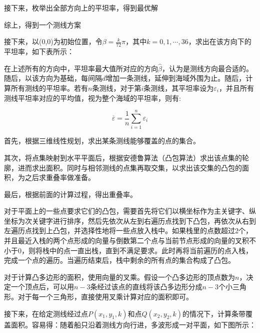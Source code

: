 接下来，枚举出全部方向上的平坦率，得到最优解

综上，得到一个测线方案

接下来，以(0,0)为初始位置，令$\beta = \frac{k}{72}\pi$，其中$k = 0, 1, \cdots, 36$，求出在该方向下的平坦率，如下表所示：




在上述所有的方向中，平坦率最大值所对应的方向$\hat \beta$，认为是测线方向最合适的。随后，以该方向为基础，每间隔$d$增加一条测线，延伸到海域外围为止。随后，计算所有测线的平坦率。若有$n$条测线，对于第$i$条测线，其平坦率设为$\varepsilon_i$，并且所有测线平坦率对应的平均值，视为整个海域的平坦率，则有:

\begin{equation}
    \overline{\varepsilon} = \frac{1}{n} \sum^{n}_{i=1}\varepsilon_i 
\end{equation}


首先，根据三维线性规划，求出某条测线能够覆盖的点的集合。

其次，将点集映射到水平平面后，根据安德鲁算法（凸包算法）求出该点集的轮廓，进而求出面积。同时与相邻测线的点集再取交集，以求出该交集的凸包的面积，为之后求重叠率做准备。

最后，根据前面的计算过程，得出重叠率。

对于平面上的一些点要求它们的凸包，需要首先将它们以横坐标作为主关键字、纵坐标为次关键字进行排序，然后先依次从左到右遍历点找到下凸包，再依次从右到左遍历点找到上凸包，并选择性地将一些点放入栈中。如果栈里的点数超过2个，并且最近入栈的两个点形成的向量与倒数第二个点与当前节点形成的向量的叉积不小于0，则将栈中的点一直出栈，直到不满足要求。此时再将当前遍历的点入栈，完成一个点的遍历。当遍历结束后，栈中剩余的所有点的集合构成了凸包。

对于计算凸多边形的面积，使用向量的叉乘。假设一个凸多边形的顶点数为$n$，决定一个顶点后，可以用$n-3$条经过该点的直线将该凸多边形分成$n-3$个小三角形。对于每一个三角形，直接使用叉乘计算对应的面积即可。

接下来，在给定测线经过点$P(x_1, y_1, k)$和点$Q(x_2, y_2, k)$的情况下，计算条带覆盖面积。容易得：随着船只沿着测线方向行进，多波形成一对平面，如下图所示：

